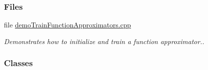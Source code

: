 \subsubsection*{Files}
\begin{DoxyCompactItemize}
\item 
file \hyperlink{demoTrainFunctionApproximators_8cpp}{demo\+Train\+Function\+Approximators.\+cpp}
\begin{DoxyCompactList}\small\item\em Demonstrates how to initialize and train a function approximator.. \end{DoxyCompactList}\end{DoxyCompactItemize}
\subsubsection*{Classes}
